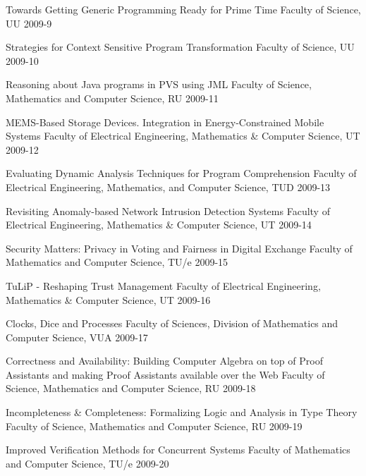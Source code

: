 \begin{multicols}{2}
         {Towards Getting Generic Programming Ready for Prime Time}
         {Faculty of Science, UU}
         {2009-9}

         {Strategies for Context Sensitive Program Transformation}
         {Faculty of Science, UU}
         {2009-10}

         {Reasoning about Java programs in PVS using JML}
         {Faculty of Science, Mathematics and Computer Science, RU}
         {2009-11}

         {MEMS-Based Storage Devices. Integration in Energy-Constrained Mobile Systems}
         {Faculty of Electrical Engineering, Mathematics \& Computer Science, UT}
         {2009-12}

         {Evaluating Dynamic Analysis Techniques for Program Comprehension}
         {Faculty of Electrical Engineering, Mathematics, and Computer Science, TUD}
         {2009-13}

         {Revisiting Anomaly-based Network Intrusion Detection Systems}
         {Faculty of Electrical Engineering, Mathematics \& Computer Science, UT}
         {2009-14}

         {Security Matters: Privacy in Voting and Fairness in Digital Exchange}
         {Faculty of Mathematics and Computer Science, TU/e}
         {2009-15}

         {TuLiP - Reshaping Trust Management}
         {Faculty of Electrical Engineering, Mathematics \& Computer Science, UT}
         {2009-16}

         {Clocks, Dice and Processes}
         {Faculty of Sciences, Division of Mathematics and Computer Science, VUA}
         {2009-17}

         {Correctness and Availability:
 Building Computer Algebra on top of Proof Assistants and making Proof
Assistants available over the Web}
         {Faculty of Science, Mathematics and Computer Science, RU}
         {2009-18}

         {Incompleteness \& Completeness: Formalizing Logic and Analysis in Type Theory}
         {Faculty of Science, Mathematics and Computer Science, RU}
         {2009-19}

         {Improved Verification Methods for Concurrent Systems}
         {Faculty of Mathematics and Computer Science, TU/e}
         {2009-20}


\end{multicols}
